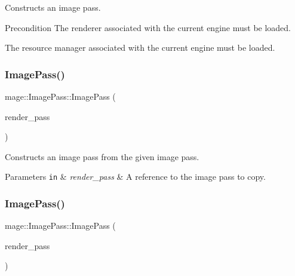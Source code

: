 Constructs an image pass.

\begin{DoxyPrecond}{Precondition}
The renderer associated with the current engine must be loaded. 

The resource manager associated with the current engine must be loaded. 
\end{DoxyPrecond}
\hypertarget{classmage_1_1_image_pass_ae0235ed340899dcff61ba38b5616267a}{}\label{classmage_1_1_image_pass_ae0235ed340899dcff61ba38b5616267a} 
\subsubsection{\texorpdfstring{Image\+Pass()}{ImagePass()}\hspace{0.1cm}{\footnotesize\ttfamily [2/3]}}
{\footnotesize\ttfamily mage\+::\+Image\+Pass\+::\+Image\+Pass (\begin{DoxyParamCaption}\item[{const \hyperlink{classmage_1_1_image_pass}{Image\+Pass} \&}]{render\+\_\+pass }\end{DoxyParamCaption})\hspace{0.3cm}{\ttfamily [delete]}}

Constructs an image pass from the given image pass.


\begin{DoxyParams}[1]{Parameters}
\mbox{\tt in}  & {\em render\+\_\+pass} & A reference to the image pass to copy. \\
\hline
\end{DoxyParams}
\hypertarget{classmage_1_1_image_pass_a4f917e053dfdfdfcdb56aea7e89ff9d1}{}\label{classmage_1_1_image_pass_a4f917e053dfdfdfcdb56aea7e89ff9d1} 
\subsubsection{\texorpdfstring{Image\+Pass()}{ImagePass()}\hspace{0.1cm}{\footnotesize\ttfamily [3/3]}}
{\footnotesize\ttfamily mage\+::\+Image\+Pass\+::\+Image\+Pass (\begin{DoxyParamCaption}\item[{\hyperlink{classmage_1_1_image_pass}{Image\+Pass} \&\&}]{render\+\_\+pass }\end{DoxyParamCaption})\hspace{0.3cm}{\ttfamily [default]}}

